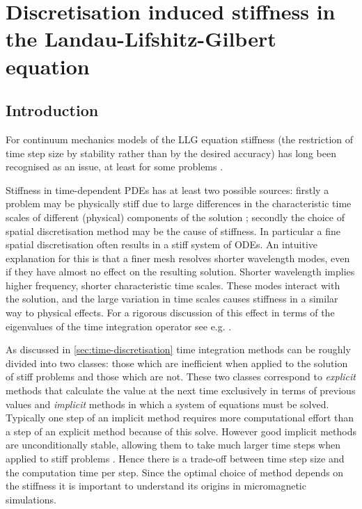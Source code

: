 
\chapter{Discretisation induced stiffness in the Landau-Lifshitz-Gilbert equation}
\label{cha:stiffn-llg-equat}


\section{Introduction}

For continuum mechanics models of the LLG equation stiffness (the restriction of time step size by stability rather than by the desired accuracy) has long been recognised as an issue, at least for some problems \cite{Nakatani1989}.

Stiffness in time-dependent PDEs has at least two possible sources:
firstly a problem may be physically stiff due to large differences in the characteristic time scales of different (physical) components of the solution \cite[Chap. 4]{Iserles2009};
secondly the choice of spatial discretisation method may be the cause of stiffness.
In particular a fine spatial discretisation often results in a stiff system of ODEs.
An intuitive explanation for this is that a finer mesh resolves shorter wavelength modes, even if they have almost no effect on the resulting solution.
Shorter wavelength implies higher frequency, \ie shorter characteristic time scales.
These modes interact with the solution, and the large variation in time scales causes stiffness in a similar way to physical effects.
For a rigorous discussion of this effect in terms of the eigenvalues of the time integration operator see e.g. \cite[Sec 8.2]{Atkinson2009}.

As discussed in \cref{sec:time-discretisation} time integration methods can be roughly divided into two classes: those which are inefficient when applied to the solution of stiff problems and those which are not.
These two classes correspond to \emph{explicit} methods that calculate the value at the next time exclusively in terms of previous values and \emph{implicit} methods in which a system of equations must be solved.
Typically one step of an implicit method requires more computational effort than a step of an explicit method because of this solve.
However good implicit methods are unconditionally stable, allowing them to take much larger time steps when applied to stiff problems \cite[Chap. 4]{Iserles2009}.
Hence there is a trade-off between time step size and the computation time per step.
Since the optimal choice of method depends on the stiffness it is important to understand its origins in micromagnetic simulations.

